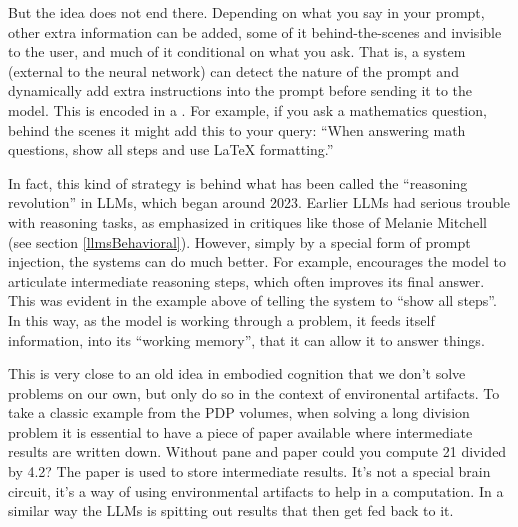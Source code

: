 But the idea does not end there. Depending on what you say in your prompt, other extra information can be added, some of it behind-the-scenes and invisible to the user, and much of it conditional on what you ask. That is, a system (external to the neural network) can detect the nature of the prompt and dynamically add extra instructions into the prompt before sending it to the model. This is encoded in a . For example, if you ask a mathematics question, behind the scenes it might add this to your query:  ``When answering math questions, show all steps and use LaTeX formatting.''

In fact, this kind of strategy is behind what has been called the ``reasoning revolution'' in LLMs, which began around 2023. Earlier LLMs had serious trouble with reasoning tasks, as emphasized in critiques like those of Melanie Mitchell (see section \ref{llmsBehavioral}). However, simply by a special form of prompt injection, the systems can do much better.  For example,  encourages the model to articulate intermediate reasoning steps, which often improves its final answer. This was evident in the example above of telling the system to ``show all steps''. In this way, as the model is working through a problem, it feeds itself information, into its ``working memory'', that it can allow it to answer things.

This is very close to an old idea in embodied cognition that we don't solve problems on our own, but only do so in the context of environental artifacts. To take a classic example from the PDP volumes, when solving a long division problem it is essential to have a piece of paper available where intermediate results are written down. Without pane and paper could you compute 21 divided by 4.2? The paper is used to store intermediate results. It's not a special brain circuit, it's a way of using environmental artifacts to help in a computation. In a similar way the LLMs is spitting out results that then get fed back to it.

